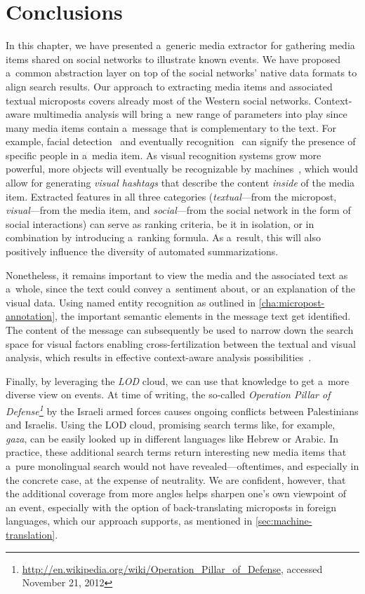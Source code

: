 \section{Conclusions}

In this chapter, we have presented a~generic media extractor
for gathering media items shared on social networks to
illustrate known events.
We have proposed a~common abstraction layer on top of the
social networks' native data formats to align search results.
Our approach to extracting media items and associated
textual microposts covers already most of
the Western social networks.
Context-aware multimedia analysis will bring a~new range of
parameters into play since many media items contain a~message
that is complementary to the text.
For example, facial detection~\cite{viola2004facedetection}
and eventually recognition~\cite{wright2009facerecognition}
can signify the presence of specific people in a~media item.
As visual recognition systems grow more powerful,
more objects will eventually be recognizable by
machines~\cite{serre2007objectrecognition},
which would allow for generating \emph{visual hashtags}
that describe the content
\emph{inside} of the media item.
Extracted features in all three categories
(\emph{textual}---from the micropost,
\emph{visual}---from the media item,
and \emph{social}---from the social network
in the form of social interactions)
can serve as ranking criteria, be it in isolation,
or in combination by introducing a~ranking formula.
As a~result, this will also positively influence
the diversity of automated summarizations.

Nonetheless, it remains important to view the media and the
associated text as a~whole, since the text
could convey a~sentiment about,
or an explanation of the visual data.
Using named entity recognition as outlined in
\autoref{cha:micropost-annotation},
the important semantic elements in the message text get identified. 
The content of the message can subsequently be used
to narrow down the search space for visual factors
enabling cross-fertilization between the textual
and visual analysis, which results in effective context-aware analysis possibilities~\cite{verborgh2012multimediaannotation}.

Finally, by leveraging the \emph{LOD} cloud,
we can use that knowledge to get a~more diverse view on events.
At time of writing, the so-called
\emph{Operation Pillar of
Defense\footnote{\url{http://en.wikipedia.org/wiki/Operation_Pillar_of_Defense}, accessed November 21, 2012}}
by the Israeli armed forces
causes ongoing conflicts between Palestinians and Israelis.
Using the LOD cloud, promising search terms like, for example,
\emph{gaza}, can be easily looked up in different languages
like Hebrew or Arabic.
In practice, these additional search terms return interesting
new media items that a~pure monolingual search
would not have revealed---oftentimes,
and especially in the concrete case,
at the expense of neutrality.
We are confident, however, that the additional coverage
from more angles helps sharpen one's own viewpoint of an event,
especially with the option of back-translating microposts
in foreign languages, which our approach supports,
as mentioned in \autoref{sec:machine-translation}.

